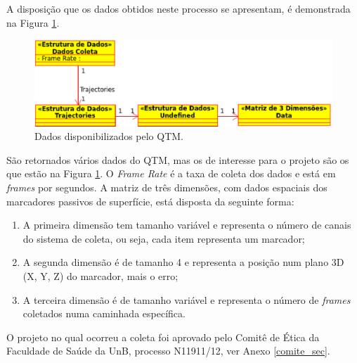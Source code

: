 A disposição que os dados obtidos neste processo se apresentam, é demonstrada na Figura \ref{dados_coleta}.

\begin{figure}[ht]
	\centering
	\includegraphics[width=15cm]{figuras/dados_coleta.eps}
	\caption{Dados disponibilizados pelo QTM.}
	\label{dados_coleta}
\end{figure}

São retornados vários dados do QTM, mas os de interesse para o projeto são os que estão na Figura \ref{dados_coleta}. 
O \emph{Frame Rate} é a taxa de coleta dos dados e está em \emph{frames} por segundos. 
A matriz de três dimensões, com dados espaciais dos marcadores passivos de superfície, está disposta da seguinte forma:
\begin{enumerate}
	\item A primeira dimensão tem tamanho variável e representa o número de canais do sistema de coleta, ou seja, cada item representa um marcador;
	\item A segunda dimensão é de tamanho 4 e representa a posição num plano 3D (X, Y, Z) do marcador, mais o erro;
	\item A terceira dimensão é de tamanho variável e representa o número de \emph{frames} coletados numa caminhada específica.
\end{enumerate}

O projeto no qual ocorreu a coleta foi aprovado
pelo Comitê de Ética da Faculdade de Saúde da UnB,
processo N11911/12, ver Anexo \ref{comite_sec}.

